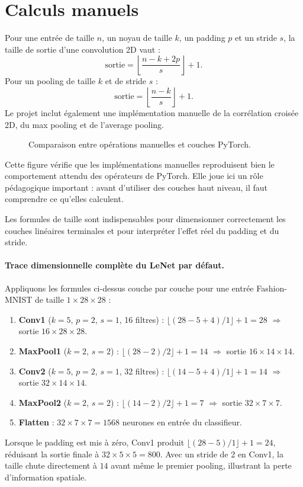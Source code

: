 \section{Calculs manuels}
Pour une entrée de taille $n$, un noyau de taille $k$, un padding $p$ et un stride $s$, la taille de sortie d’une convolution 2D vaut :
\[
\text{sortie} = \left\lfloor \frac{n-k+2p}{s} \right\rfloor + 1.
\]
Pour un pooling de taille $k$ et de stride $s$ :
\[
\text{sortie} = \left\lfloor \frac{n-k}{s} \right\rfloor + 1.
\]
Le projet inclut également une implémentation manuelle de la corrélation croisée 2D, du max pooling et de l’average pooling.

\begin{figure}[H]
    \centering
    \caption{Comparaison entre opérations manuelles et couches PyTorch.}
\end{figure}
Cette figure vérifie que les implémentations manuelles reproduisent bien le comportement attendu des opérateurs de PyTorch. Elle joue ici un rôle pédagogique important : avant d’utiliser des couches haut niveau, il faut comprendre ce qu’elles calculent.

\begin{table}[H]
    \centering
    \caption{Résultats des calculs de taille de sortie pour convolution et pooling.}
\end{table}
Les formules de taille sont indispensables pour dimensionner correctement les couches linéaires terminales et pour interpréter l'effet réel du padding et du stride.

\paragraph{Trace dimensionnelle complète du LeNet par défaut.}
Appliquons les formules ci-dessus couche par couche pour une entrée Fashion-MNIST de taille $1 \times 28 \times 28$ :
\begin{enumerate}
    \item \textbf{Conv1} ($k=5$, $p=2$, $s=1$, 16 filtres) : $\lfloor(28-5+4)/1\rfloor+1 = 28$ $\Rightarrow$ sortie $16 \times 28 \times 28$.
    \item \textbf{MaxPool1} ($k=2$, $s=2$) : $\lfloor(28-2)/2\rfloor+1 = 14$ $\Rightarrow$ sortie $16 \times 14 \times 14$.
    \item \textbf{Conv2} ($k=5$, $p=2$, $s=1$, 32 filtres) : $\lfloor(14-5+4)/1\rfloor+1 = 14$ $\Rightarrow$ sortie $32 \times 14 \times 14$.
    \item \textbf{MaxPool2} ($k=2$, $s=2$) : $\lfloor(14-2)/2\rfloor+1 = 7$ $\Rightarrow$ sortie $32 \times 7 \times 7$.
    \item \textbf{Flatten} : $32 \times 7 \times 7 = 1568$ neurones en entrée du classifieur.
\end{enumerate}
Lorsque le padding est mis à zéro, Conv1 produit $\lfloor(28-5)/1\rfloor+1 = 24$, réduisant la sortie finale à $32 \times 5 \times 5 = 800$. Avec un stride de 2 en Conv1, la taille chute directement à $14$ avant même le premier pooling, illustrant la perte d'information spatiale.

